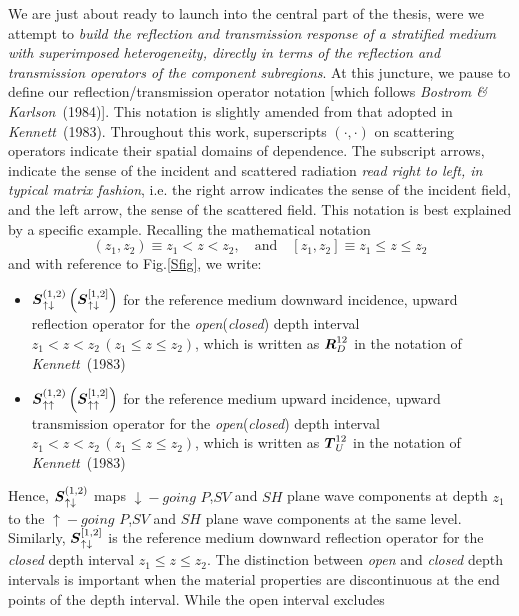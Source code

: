 We are just about ready to launch into the central part of the thesis, 
were we attempt to {\em build the reflection and transmission response of 
a stratified medium with superimposed heterogeneity, directly in terms of 
the reflection and transmission operators of the component subregions\/}. 
At this juncture, we pause to define our reflection/transmission operator 
notation [which follows {\em Bostrom \& Karlson\/}~(1984)]. 
This notation  is slightly amended from that adopted in {\em Kennett\/}~(1983). 
Throughout this work,  superscripts $(\cdot,\cdot)$ on scattering
operators indicate their spatial domains of dependence. The subscript arrows,
indicate the sense of the incident and scattered radiation {\em read right to left, in
typical matrix fashion}, i.e. the right arrow  indicates the sense of the incident field, and
the left arrow, the sense of the scattered field.
This notation is best explained by a specific example.
Recalling the mathematical notation 
\[
(z_1,z_2)\equiv z_{1} < z < z_{2}, \quad \mbox{and} \quad
[z_1,z_2]\equiv z_{1} \le z \le z_{2} 
\] 
and with reference to Fig.\ref{Sfig}, we write:
\begin{itemize}
\item ${\mbox{\boldmath$\mit S$\unboldmath}}_{\uparrow\downarrow }^{(1 , 2)}\left({\mbox{\boldmath$\mit S$\unboldmath}}_{\uparrow\downarrow }^{[1 , 2]}\right)$
for the reference medium downward incidence, upward reflection operator for the 
{\em open\/}({\em closed\/}) depth interval 
$z_1 <   z <  z_2\, (z_1 \le   z \le  z_2)$, which is written as ${\mbox{\boldmath$\mit R$\unboldmath}}_{D }^{1  2}$ in the 
notation of {\em Kennett\/}~(1983)
\item ${\mbox{\boldmath$\mit S$\unboldmath}}_{\uparrow\uparrow }^{(1 , 2)}\left({\mbox{\boldmath$\mit S$\unboldmath}}_{\uparrow\uparrow }^{[1 , 2]}\right)$
for the reference medium upward incidence, upward transmission operator for the 
{\em open\/}({\em closed\/}) depth interval 
$z_1 <   z <  z_2\, (z_1 \le   z \le  z_2)$, which is written as ${\mbox{\boldmath$\mit T$\unboldmath}}_{U }^{1  2}$ in the 
notation of {\em Kennett\/}~(1983)
\end{itemize}
Hence, ${\mbox{\boldmath$\mit S$\unboldmath}}_{\uparrow\downarrow }^{(1,2)}$ maps   $\downarrow\!  \!-going$
$P$,$SV$  and $SH$ plane wave components at depth $ {z}_{1} $ to the  $\uparrow\!  \!-going$ 
$P$,$SV$  and $SH$ plane wave components at the same level. Similarly, ${\mbox{\boldmath$\mit S$\unboldmath}}_{\uparrow\downarrow }^{[1 , 2]}$
is the reference medium downward reflection operator for the {\em closed\/} depth interval 
$z_1 \le   z \le  z_2$. The distinction between {\em open\/} and {\em 
closed\/} depth intervals is important when the material properties are discontinuous at 
the end points of the depth interval. While the open interval excludes 
